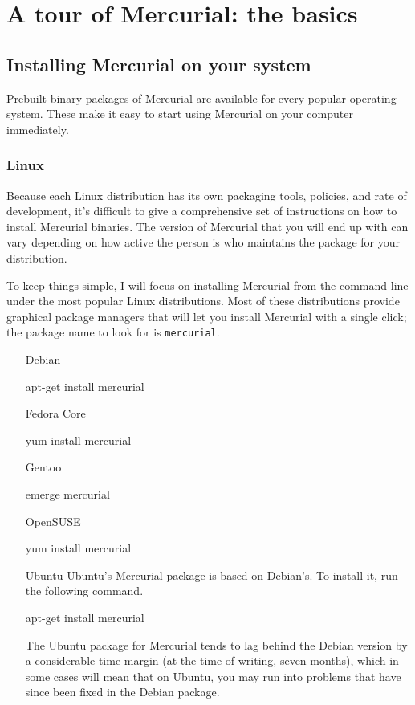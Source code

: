 \chapter{A tour of Mercurial: the basics}
\label{chap:tour-basic}

\section{Installing Mercurial on your system}
\label{sec:tour:install}

Prebuilt binary packages of Mercurial are available for every popular
operating system.  These make it easy to start using Mercurial on your
computer immediately.

\subsection{Linux}

Because each Linux distribution has its own packaging tools, policies,
and rate of development, it's difficult to give a comprehensive set of
instructions on how to install Mercurial binaries.  The version of
Mercurial that you will end up with can vary depending on how active
the person is who maintains the package for your distribution.

To keep things simple, I will focus on installing Mercurial from the
command line under the most popular Linux distributions.  Most of
these distributions provide graphical package managers that will let
you install Mercurial with a single click; the package name to look
for is \texttt{mercurial}.

\begin{itemize}
\item[Debian]
  \begin{codesample4}
    apt-get install mercurial
  \end{codesample4}

\item[Fedora Core]
  \begin{codesample4}
    yum install mercurial
  \end{codesample4}

\item[Gentoo]
  \begin{codesample4}
    emerge mercurial
  \end{codesample4}

\item[OpenSUSE]
  \begin{codesample4}
    yum install mercurial
  \end{codesample4}

\item[Ubuntu] Ubuntu's Mercurial package is based on Debian's.  To
  install it, run the following command.
  \begin{codesample4}
    apt-get install mercurial
  \end{codesample4}
  The Ubuntu package for Mercurial tends to lag behind the Debian
  version by a considerable time margin (at the time of writing, seven
  months), which in some cases will mean that on Ubuntu, you may run
  into problems that have since been fixed in the Debian package.
\end{itemize}

